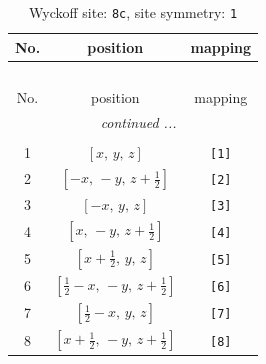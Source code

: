 \documentclass[fleqn,8pt]{jsarticle}
\begin{document}
\renewcommand{\arraystretch}{1.2}
\begin{longtable}{ccc}
\caption{Wyckoff site: {\tt 8c}, site symmetry: {\tt 1}}
 \\
 \hline \hline
No. & position & mapping \\ \hline \endfirsthead

\multicolumn{2}{l}{\tablename\ \thetable{}} \\
 \hline \hline
No. & position & mapping \\ \hline \endhead

 \hline \hline
\multicolumn{2}{r}{\footnotesize\it continued ...} \\ \endfoot

 \hline \hline
\multicolumn{2}{r}{} \\ \endlastfoot

1 & $\left[ x,\, y,\, z \right]$ & {\tt [1]} \\ \hline
2 & $\left[ - x,\, - y,\, z + \frac{1}{2} \right]$ & {\tt [2]} \\ \hline
3 & $\left[ - x,\, y,\, z \right]$ & {\tt [3]} \\ \hline
4 & $\left[ x,\, - y,\, z + \frac{1}{2} \right]$ & {\tt [4]} \\ \hline
5 & $\left[ x + \frac{1}{2},\, y,\, z \right]$ & {\tt [5]} \\ \hline
6 & $\left[ \frac{1}{2} - x,\, - y,\, z + \frac{1}{2} \right]$ & {\tt [6]} \\ \hline
7 & $\left[ \frac{1}{2} - x,\, y,\, z \right]$ & {\tt [7]} \\ \hline
8 & $\left[ x + \frac{1}{2},\, - y,\, z + \frac{1}{2} \right]$ & {\tt [8]} \\
\end{longtable}
\end{document}

